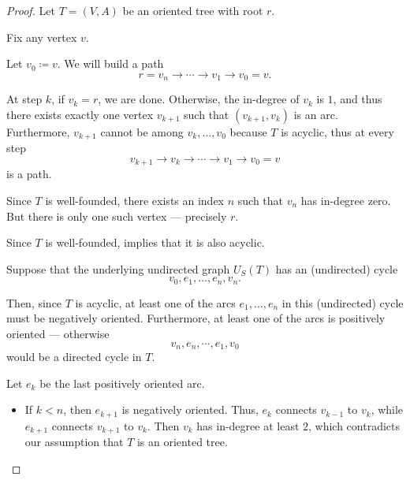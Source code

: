 \begin{proof}
   Let \( T = (V, A) \) be an oriented tree with root \( r \).

   Fix any vertex \( v \).

  Let \( v_0 \coloneqq v \). We will build a path
  \begin{equation*}
    r = v_n \to \cdots \to v_1 \to v_0 = v.
  \end{equation*}

  At step \( k \), if \( v_k = r \), we are done. Otherwise, the in-degree of \( v_k \) is \( 1 \), and thus there exists exactly one vertex \( v_{k+1} \) such that \( (v_{k+1}, v_k) \) is an arc. Furthermore, \( v_{k+1} \) cannot be among \( v_k, \ldots, v_0 \) because \( T \) is acyclic, thus at every step
  \begin{equation*}
    v_{k+1} \to v_k \to \cdots \to v_1 \to v_0 = v
  \end{equation*}
  is a path.

  Since \( T \) is well-founded, there exists an index \( n \) such that \( v_n \) has in-degree zero. But there is only one such vertex --- precisely \( r \).

   Since \( T \) is well-founded,  implies that it is also acyclic.

  Suppose that the underlying undirected graph \( U_S(T) \) has an (undirected) cycle
  \begin{equation*}
    v_0, e_1, \ldots, e_n, v_n.
  \end{equation*}

  Then, since \( T \) is acyclic, at least one of the arcs \( e_1, \ldots, e_n \) in this (undirected) cycle must be negatively oriented. Furthermore, at least one of the arcs is positively oriented --- otherwise
  \begin{equation*}
    v_n, e_n, \cdots, e_1, v_0
  \end{equation*}
  would be a directed cycle in \( T \).

  Let \( e_k \) be the last positively oriented arc.
  \begin{itemize}
    \item If \( k < n \), then \( e_{k+1} \) is negatively oriented. Thus, \( e_k \) connects \( v_{k-1} \) to \( v_k \), while \( e_{k+1} \) connects \( v_{k+1} \) to \( v_k \). Then \( v_k \) has in-degree at least \( 2 \), which contradicts our assumption that \( T \) is an oriented tree.


\end{itemize}
\end{proof}
